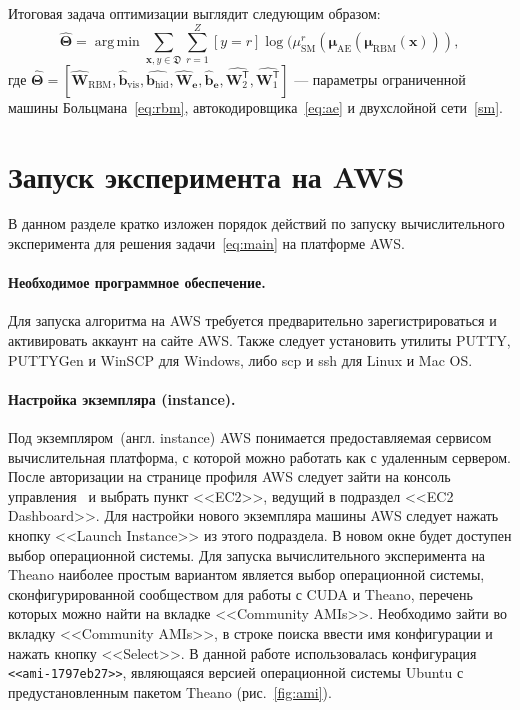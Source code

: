 \documentclass[12pt]{article}
\DeclareMathOperator*{\argmin}{arg\,min}
\begin{document}
Итоговая задача оптимизации выглядит следующим образом:
\[
 \hat{\mathbf{\mathbf{\Theta}}} = \argmin\sum_{\mathbf{x},y \in \mathfrak{D}}\sum_{r = 1}^Z[y = r]\log({\mu}^r_\text{SM}(\mathbf{\boldsymbol{\mu}}_\text{AE}(\mathbf{\boldsymbol{\mu}}_\text{RBM}(\mathbf{x}))),
\]
где $\hat{\mathbf{\mathbf{\Theta}}} = [\hat{\mathbf{W}}_\text{RBM},\hat{\mathbf{b}}_\text{vis},\hat{\mathbf{b}_\text{hid}}, \hat{\mathbf{W}}_\textbf{e}, \hat{\mathbf{b}}_\textbf{e}, \hat{\mathbf{W}^\mathsf{T}_2}, \hat{\mathbf{W}^\mathsf{T}_1}]$ --- параметры ограниченной машины Больцмана~\eqref{eq:rbm}, автокодировщика~\eqref{eq:ae} и двухслойной сети~\eqref{sm}.


\section{Запуск эксперимента на AWS}
В данном разделе кратко изложен порядок действий по запуску вычислительного эксперимента для решения задачи~\eqref{eq:main} на платформе AWS.
\paragraph{Необходимое программное обеспечение.}
Для запуска алгоритма на AWS требуется предварительно зарегистрироваться и активировать аккаунт на сайте AWS. Также следует установить утилиты PUTTY, PUTTYGen и WinSCP для Windows, либо scp и ssh для Linux и Mac OS.
\paragraph{Настройка экземпляра (instance).} Под экземпляром~(англ. instance) AWS понимается предоставляемая сервисом вычислительная платформа, с которой можно работать как с удаленным сервером.
После авторизации на странице профиля AWS следует зайти на консоль управления~\cite{console} и выбрать пункт <<EC2>>, ведущий в подраздел <<EC2 Dashboard>>. Для настройки нового экземпляра машины AWS следует нажать кнопку <<Launch Instance>> из этого подраздела. В новом окне будет доступен выбор операционной системы. Для запуска вычислительного эксперимента на Theano наиболее простым вариантом является выбор операционной системы, сконфигурированной сообществом для работы с CUDA и Theano, перечень которых можно найти на вкладке <<Community AMIs>>. Необходимо зайти во вкладку <<Community AMIs>>, в строке поиска ввести имя конфигурации и нажать кнопку <<Select>>.
В данной работе использовалась конфигурация \texttt{<<ami-1797eb27>>}, являющаяся версией операционной системы Ubuntu с предустановленным пакетом Theano (рис.~\ref{fig:ami}).
\end{document}
